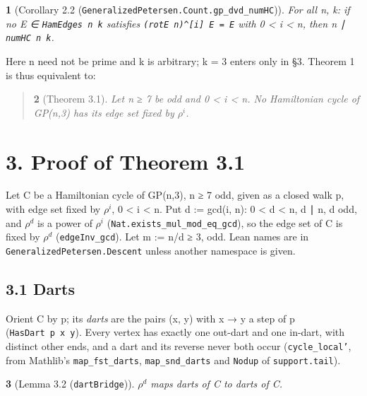 \documentclass[11pt,a4paper]{article}
\theoremstyle{named}
\newtheorem*{namedthm}{}
\begin{document}
\begin{namedthm}[Corollary 2.2 (\texttt{GeneralizedPetersen.\allowbreak{}Count.\allowbreak{}gp\_\allowbreak{}dvd\_\allowbreak{}numHC})]
For all n, k: if no E ∈ \texttt{HamEdges\ \allowbreak{}n\ \allowbreak{}k} satisfies \texttt{(rotE\ \allowbreak{}n)\textasciicircum{}[i]\ \allowbreak{}E\ \allowbreak{}=\ \allowbreak{}E} with 0 \textless{} i \textless{} n, then n ∣ \texttt{numHC\ \allowbreak{}n\ \allowbreak{}k}.
\end{namedthm}

Here n need not be prime and k is arbitrary; k = 3 enters only in §3. Theorem 1 is thus equivalent to:

\begin{quote}
\begin{namedthm}[Theorem 3.1]
Let n ≥ 7 be odd and 0 \textless{} i \textless{} n. No Hamiltonian cycle of GP(n,3) has its edge set fixed by $ρ^i$.
\end{namedthm}
\end{quote}

\section*{3. Proof of Theorem 3.1}
Let C be a Hamiltonian cycle of GP(n,3), n ≥ 7 odd, given as a closed walk p, with edge set fixed by $ρ^i$, 0 \textless{} i \textless{} n. Put d := gcd(i, n): 0 \textless{} d \textless{} n, d ∣ n, d odd, and $ρ^d$ is a power of $ρ^i$ (\texttt{Nat.\allowbreak{}exists\_\allowbreak{}mul\_\allowbreak{}mod\_\allowbreak{}eq\_\allowbreak{}gcd}), so the edge set of C is fixed by $ρ^d$ (\texttt{edgeInv\_\allowbreak{}gcd}). Let m := n/d ≥ 3, odd. Lean names are in \texttt{GeneralizedPetersen.\allowbreak{}Descent} unless another namespace is given.

\subsection*{3.1 Darts}
Orient C by p; its \textit{darts} are the pairs (x, y) with x → y a step of p (\texttt{HasDart\ \allowbreak{}p\ \allowbreak{}x\ \allowbreak{}y}). Every vertex has exactly one out-dart and one in-dart, with distinct other ends, and a dart and its reverse never both occur (\texttt{cycle\_\allowbreak{}local'}, from Mathlib's \texttt{map\_\allowbreak{}fst\_\allowbreak{}darts}, \texttt{map\_\allowbreak{}snd\_\allowbreak{}darts} and \texttt{Nodup} of \texttt{support.\allowbreak{}tail}).

\begin{namedthm}[Lemma 3.2 (\texttt{dartBridge})]
$ρ^d$ maps darts of C to darts of C.
\end{namedthm}
\end{document}
